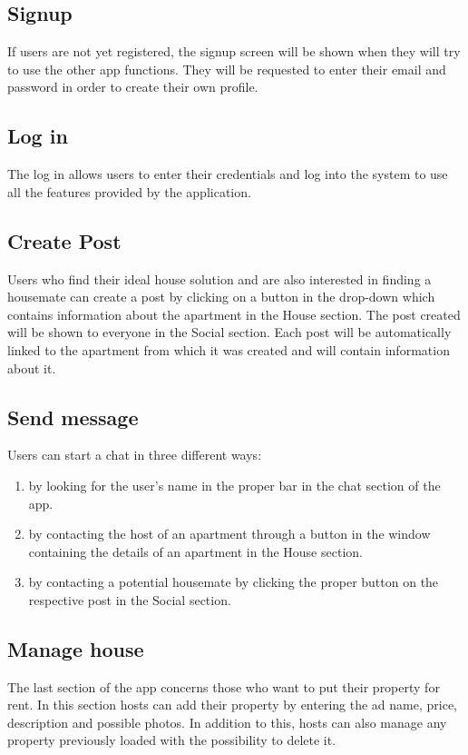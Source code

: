 \subsection{Signup}
If users are not yet registered, the signup screen will be shown when they will try to use the other app functions. They will be requested to enter their email and password in order to create their own profile.

\subsection{Log in}
The log in allows users to enter their credentials and log into the system to use all the features provided by the application.

\subsection{Create Post}
Users who find their ideal house solution and are also interested in finding a housemate can create a post by clicking on a button in the drop-down which contains information about the apartment in the House section. The post created will be shown to everyone in the Social section. Each post will be automatically linked to the apartment from which it was created and will contain information about it.

\subsection{Send message}
Users can start a chat in three different ways:
\begin{enumerate}
    \item by looking for the user's name in the proper bar in the chat section of the app.
    \item by contacting the host of an apartment through a button in the window containing the details of an apartment in the House section.
    \item by contacting a potential housemate by clicking the proper button on the respective post in the Social section.
\end{enumerate}

\subsection{Manage house}
The last section of the app concerns those who want to put their property for rent. In this section hosts can add their property by entering the ad name, price, description and possible photos. In addition to this, hosts can also manage any property previously loaded with the possibility to delete it.